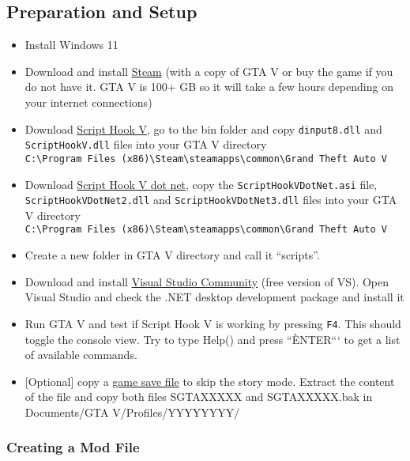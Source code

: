 \documentclass[
  openany]{book}
\begin{document}
\hypertarget{preparation-and-setup}{%
\subsection*{Preparation and Setup}\label{preparation-and-setup}}

\begin{itemize}
\item
  Install Windows 11
\item
  Download and install \href{https://store.steampowered.com/about/}{Steam} (with a copy of GTA V or buy the game if you do not have it. GTA V is 100+ GB so it will take a few hours depending on your internet connections)
\item
  Download \href{https://www.gta5-mods.com/tools/script-hook-v}{Script Hook V}, go to the bin folder and copy \texttt{dinput8.dll} and \texttt{ScriptHookV.dll} files into your GTA V directory \texttt{C:\textbackslash{}Program\ Files\ (x86)\textbackslash{}Steam\textbackslash{}steamapps\textbackslash{}common\textbackslash{}Grand\ Theft\ Auto\ V}
\item
  Download \href{https://github.com/crosire/scripthookvdotnet/releases}{Script Hook V dot net}, copy the \texttt{ScriptHookVDotNet.asi} file, \texttt{ScriptHookVDotNet2.dll} and \texttt{ScriptHookVDotNet3.dll} files into your GTA V directory \texttt{C:\textbackslash{}Program\ Files\ (x86)\textbackslash{}Steam\textbackslash{}steamapps\textbackslash{}common\textbackslash{}Grand\ Theft\ Auto\ V}
\item
  Create a new folder in GTA V directory and call it ``scripts''.
\item
  Download and install \href{https://visualstudio.microsoft.com/vs/community/}{Visual Studio Community} (free version of VS). Open Visual Studio and check the .NET desktop development package and install it
\item
  Run GTA V and test if Script Hook V is working by pressing \texttt{F4}. This should toggle the console view. Try to type Help() and press ``ÈNTER``` to get a list of available commands.
\item
  {[}Optional{]} copy a \href{https://www.gta5-mods.com/misc/100-save-game}{game save file} to skip the story mode. Extract the content of the file and copy both files SGTAXXXXX and SGTAXXXXX.bak in Documents/GTA V/Profiles/YYYYYYYY/
\end{itemize}

\hypertarget{creating-a-mod-file}{%
\subsubsection*{Creating a Mod File}\label{creating-a-mod-file}}
\end{document}
